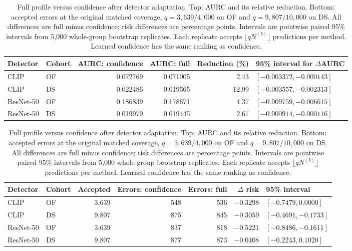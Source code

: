 \begin{table}[t]
\caption{Full profile versus confidence after detector adaptation. Top: AURC and its relative reduction. Bottom: accepted errors at the original matched coverage, $q=3,639/4,000$ on OF and $q=9,807/10,000$ on DS. All differences are full minus confidence; risk differences are percentage points. Intervals are pointwise paired 95\% intervals from 5,000 whole-group bootstrap replicates. Each replicate accepts $\lfloor qN^{(b)}\rfloor$ predictions per method. Learned confidence has the same ranking as confidence.}
\label{tab:adapted_selectors}
\centering\small
\setlength{\tabcolsep}{5pt}
\begin{tabular}{llrrrl}
\toprule
Detector & Cohort & AURC: confidence & AURC: full & Reduction (\%) & 95\% interval for $\Delta$AURC \\
\midrule
CLIP & OF & 0.072769 & 0.071005 & 2.43 & $[-0.003372,-0.000143]$ \\
CLIP & DS & 0.022486 & 0.019565 & 12.99 & $[-0.003557,-0.002313]$ \\
ResNet-50 & OF & 0.186839 & 0.178671 & 4.37 & $[-0.009759,-0.006615]$ \\
ResNet-50 & DS & 0.019979 & 0.019445 & 2.67 & $[-0.000914,-0.000116]$ \\
\bottomrule
\end{tabular}
\par\vspace{5pt}
\begin{tabular}{llrrrrl}
\toprule
Detector & Cohort & Accepted & Errors: confidence & Errors: full & $\Delta$ risk & 95\% interval \\
\midrule
CLIP & OF & 3,639 & 548 & 536 & $-0.3298$ & $[-0.7479,0.0000]$ \\
CLIP & DS & 9,807 & 875 & 845 & $-0.3059$ & $[-0.4691,-0.1733]$ \\
ResNet-50 & OF & 3,639 & 837 & 818 & $-0.5221$ & $[-0.8486,-0.1611]$ \\
ResNet-50 & DS & 9,807 & 877 & 873 & $-0.0408$ & $[-0.2243,0.1020]$ \\
\bottomrule
\end{tabular}
\end{table}

